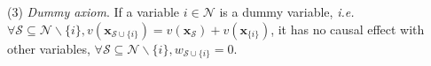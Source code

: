 (3) \textit{Dummy axiom}. If a variable {\small $i\in\mathcal{N}$} is a dummy variable, \emph{i.e.} 
{\small $\forall \mathcal{S}\subseteq \mathcal{N}\backslash\{i\}, v(\boldsymbol{x}_{\mathcal{S}\cup\{i\}})=v(\boldsymbol{x}_{\mathcal{S}})+v(\boldsymbol{x}_{\{i\}})$}, it has no causal effect with other variables, {\small $\forall \mathcal{S}\subseteq \mathcal{N}\backslash\{i\}, w_{\mathcal{S}\cup\{i\}}=0$}.
